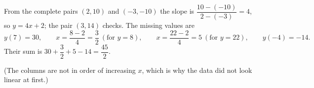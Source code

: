 From the complete pairs $(2,10)$ and $(-3,-10)$ the slope is $\dfrac{10-(-10)}{2-(-3)}=4$, so $y=4x+2$; the pair $(3,14)$ checks. The missing values are
\[
y(7)=30,\qquad x=\dfrac{8-2}{4}=\dfrac{3}{2} \ (\text{for } y=8),\qquad x=\dfrac{22-2}{4}=5 \ (\text{for } y=22),\qquad y(-4)=-14 .
\]
Their sum is $30+\dfrac{3}{2}+5-14=\boxed{\dfrac{45}{2}}$.

(The columns are not in order of increasing $x$, which is why the data did not look linear at first.)
